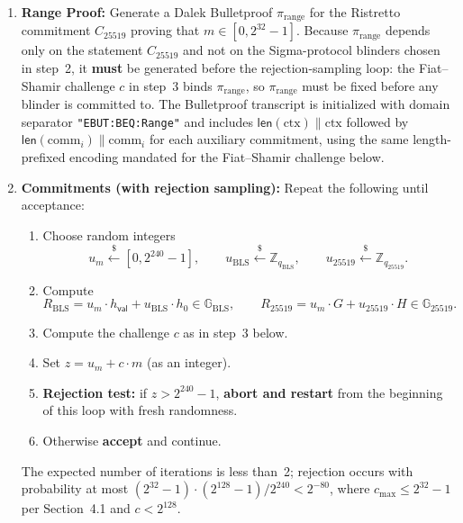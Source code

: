 \documentclass[11pt]{article}
\theoremstyle{definitionstyle}
\theoremstyle{plain}
\begin{document}
\begin{enumerate}[leftmargin=*]
\item \textbf{Range Proof:}
  Generate a Dalek Bulletproof $\pi_{\text{range}}$ for the Ristretto commitment $C_{25519}$ proving that $m \in [0, 2^{32}-1]$. Because $\pi_{\text{range}}$ depends only on the statement $C_{25519}$ and not on the Sigma-protocol blinders chosen in step~2, it \textbf{must} be generated before the rejection-sampling loop: the Fiat--Shamir challenge $c$ in step~3 binds $\pi_{\text{range}}$, so $\pi_{\text{range}}$ must be fixed before any blinder is committed to. The Bulletproof transcript is initialized with domain separator \texttt{"EBUT:BEQ:Range"} and includes $\mathsf{len}(\text{ctx}) \parallel \text{ctx}$ followed by $\mathsf{len}(\text{comm}_i) \parallel \text{comm}_i$ for each auxiliary commitment, using the same length-prefixed encoding mandated for the Fiat--Shamir challenge below.

\item \textbf{Commitments (with rejection sampling):}
  Repeat the following until acceptance:
  \begin{enumerate}
  \item Choose random integers
    \[
    u_m \xleftarrow{\$} [0, 2^{240}-1], \qquad
    u_{\text{BLS}} \xleftarrow{\$} \mathbb{Z}_{q_{\text{BLS}}}, \qquad
    u_{25519} \xleftarrow{\$} \mathbb{Z}_{q_{25519}}.
    \]
  \item Compute
    \[
    R_{\text{BLS}} = u_m \cdot h_{\mathsf{val}} + u_{\text{BLS}} \cdot h_0 \in \mathbb{G}_{\text{BLS}}, \qquad
    R_{25519} = u_m \cdot G + u_{25519} \cdot H \in \mathbb{G}_{25519}.
    \]
  \item Compute the challenge $c$ as in step~3 below.
  \item Set $z = u_m + c \cdot m$ (as an integer).
  \item \textbf{Rejection test:} if $z > 2^{240}-1$, \textbf{abort and restart} from the beginning of this loop with fresh randomness.
  \item Otherwise \textbf{accept} and continue.
  \end{enumerate}
  The expected number of iterations is less than~2; rejection occurs with probability at most $(2^{32}-1) \cdot (2^{128}-1) / 2^{240} < 2^{-80}$, where $c_{\max} \le 2^{32}-1$ per Section~4.1 and $c < 2^{128}$.


\end{enumerate}
\end{document}
